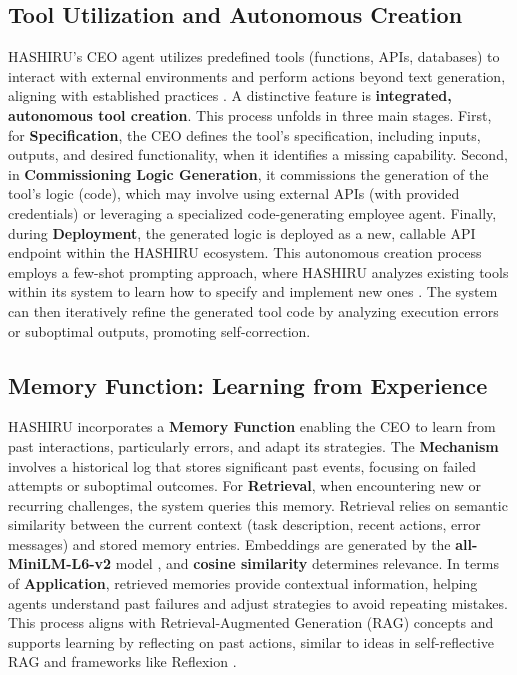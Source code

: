 \documentclass[twocolumn]{article}
\begin{document}
\subsection{Tool Utilization and Autonomous Creation}
\label{subsec:tech_tooling}
HASHIRU's CEO agent utilizes predefined tools (functions, APIs, databases) to interact with external environments and perform actions beyond text generation, aligning with established practices \cite{yao2022react, openai_func_calling}.
A distinctive feature is \textbf{integrated, autonomous tool creation}. This process unfolds in three main stages. First, for \textbf{Specification}, the CEO defines the tool's specification, including inputs, outputs, and desired functionality, when it identifies a missing capability. Second, in \textbf{Commissioning Logic Generation}, it commissions the generation of the tool's logic (code), which may involve using external APIs (with provided credentials) or leveraging a specialized code-generating employee agent. Finally, during \textbf{Deployment}, the generated logic is deployed as a new, callable API endpoint within the HASHIRU ecosystem.
This autonomous creation process employs a few-shot prompting approach, where HASHIRU analyzes existing tools within its system to learn how to specify and implement new ones \cite{brown2020language}. The system can then iteratively refine the generated tool code by analyzing execution errors or suboptimal outputs, promoting self-correction.

\subsection{Memory Function: Learning from Experience}
\label{subsec:tech_memory}
HASHIRU incorporates a \textbf{Memory Function} enabling the CEO to learn from past interactions, particularly errors, and adapt its strategies.
The \textbf{Mechanism} involves a historical log that stores significant past events, focusing on failed attempts or suboptimal outcomes. For \textbf{Retrieval}, when encountering new or recurring challenges, the system queries this memory. Retrieval relies on semantic similarity between the current context (task description, recent actions, error messages) and stored memory entries. Embeddings are generated by the \textbf{all-MiniLM-L6-v2} model \cite{wang2020minilmdeepselfattentiondistillation}, and \textbf{cosine similarity} determines relevance. In terms of \textbf{Application}, retrieved memories provide contextual information, helping agents understand past failures and adjust strategies to avoid repeating mistakes. This process aligns with Retrieval-Augmented Generation (RAG) concepts \cite{lewis2021retrievalaugmentedgenerationknowledgeintensivenlp} and supports learning by reflecting on past actions, similar to ideas in self-reflective RAG \cite{asai2023self} and frameworks like Reflexion \cite{shinn2023reflexion}.
\end{document}
